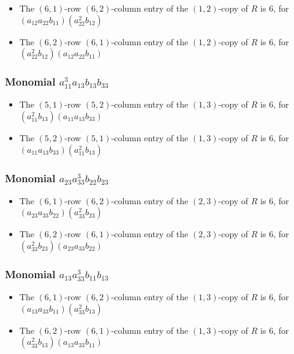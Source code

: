 \documentclass{article}
\begin{document}
\begin{itemize}
\item The $(6, 1)$-row $(6, 2)$-column entry of the $ \left(1, 2\right) $-copy of $R$ is $ 6 $, for $( a_{12} a_{22} b_{11} )( a_{22}^{2} b_{12} )$ 
\item The $(6, 2)$-row $(6, 1)$-column entry of the $ \left(1, 2\right) $-copy of $R$ is $ 6 $, for $( a_{22}^{2} b_{12} )( a_{12} a_{22} b_{11} )$ 
\end{itemize}
\subsubsection{Monomial $ a_{11}^{3} a_{13} b_{13} b_{33} $}

\begin{itemize}
\item The $(5, 1)$-row $(5, 2)$-column entry of the $ \left(1, 3\right) $-copy of $R$ is $ 6 $, for $( a_{11}^{2} b_{13} )( a_{11} a_{13} b_{33} )$ 
\item The $(5, 2)$-row $(5, 1)$-column entry of the $ \left(1, 3\right) $-copy of $R$ is $ 6 $, for $( a_{11} a_{13} b_{33} )( a_{11}^{2} b_{13} )$ 
\end{itemize}
\subsubsection{Monomial $ a_{23} a_{33}^{3} b_{22} b_{23} $}

\begin{itemize}
\item The $(6, 1)$-row $(6, 2)$-column entry of the $ \left(2, 3\right) $-copy of $R$ is $ 6 $, for $( a_{23} a_{33} b_{22} )( a_{33}^{2} b_{23} )$ 
\item The $(6, 2)$-row $(6, 1)$-column entry of the $ \left(2, 3\right) $-copy of $R$ is $ 6 $, for $( a_{33}^{2} b_{23} )( a_{23} a_{33} b_{22} )$ 
\end{itemize}
\subsubsection{Monomial $ a_{13} a_{33}^{3} b_{11} b_{13} $}

\begin{itemize}
\item The $(6, 1)$-row $(6, 2)$-column entry of the $ \left(1, 3\right) $-copy of $R$ is $ 6 $, for $( a_{13} a_{33} b_{11} )( a_{33}^{2} b_{13} )$ 
\item The $(6, 2)$-row $(6, 1)$-column entry of the $ \left(1, 3\right) $-copy of $R$ is $ 6 $, for $( a_{33}^{2} b_{13} )( a_{13} a_{33} b_{11} )$ 
\end{itemize}
\end{document}
